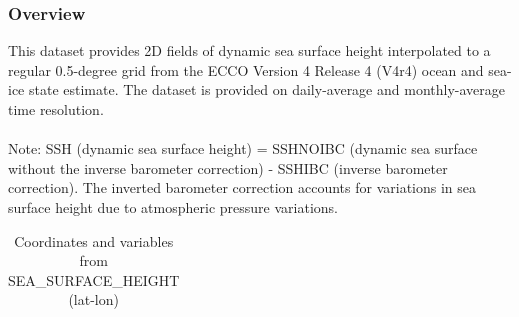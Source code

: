 \subsubsection{Overview}
\newp
This dataset provides 2D fields of dynamic sea surface height interpolated to a regular 0.5-degree grid from the ECCO Version 4 Release 4 (V4r4) ocean and sea-ice state estimate. The dataset is provided on daily-average and monthly-average time resolution.
\\\\
Note: SSH (dynamic sea surface height) = SSHNOIBC (dynamic sea surface without the inverse barometer correction) - SSHIBC (inverse barometer correction). The inverted barometer correction accounts for variations in sea surface height due to atmospheric pressure variations.
\\
\begin{longtable}{|m{}|m{}|m{}|}
\caption{Coordinates and variables from SEA\_SURFACE\_HEIGHT (lat-lon)}
\label{tab:table-<xarray.Dataset> Size: 3MB
Dimensions:         (time: 1, latitude: 360, longitude: 720, nv: 2)
Coordinates:
  * time            (time) datetime64[ns] 8B 2017-12-29T12:00:00
  * latitude        (latitude) float32 1kB -89.75 -89.25 -88.75 ... 89.25 89.75
  * longitude       (longitude) float32 3kB -179.8 -179.2 -178.8 ... 179.2 179.8
    time_bnds       (time, nv) datetime64[ns] 16B ...
    latitude_bnds   (latitude, nv) float32 3kB ...
    longitude_bnds  (longitude, nv) float32 6kB ...
Dimensions without coordinates: nv
Data variables:
    SSH             (time, latitude, longitude) float32 1MB ...
    SSHIBC          (time, latitude, longitude) float32 1MB ...
    SSHNOIBC        (time, latitude, longitude) float32 1MB ...
Attributes: (12/57)
    acknowledgement:              This research was carried out by the Jet Pr...
    author:                       Ian Fenty and Ou Wang
    cdm_data_type:                Grid
    comment:                      Fields provided on a regular lat-lon grid. ...
    Conventions:                  CF-1.8, ACDD-1.3
    coordinates_comment:          Note: the global 'coordinates' attribute de...
    ...                           ...
    time_coverage_duration:       P1D
    time_coverage_end:            2017-12-30T00:00:00
    time_coverage_resolution:     P1D
    time_coverage_start:          2017-12-29T00:00:00
    title:                        ECCO Sea Surface Height - Daily Mean 0.5 De...
    uuid:                         7beb77e0-404a-11eb-8bf7-0cc47a3f891b-fields} \\ 

\end{longtable}
